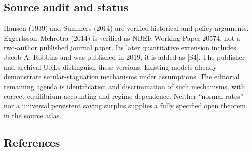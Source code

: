 \documentclass[11pt,a4paper]{article}
\begin{document}
\subsection*{Source audit and status}

Hansen (1939) and Summers (2014) are verified historical and policy arguments. Eggertsson--Mehrotra (2014) is verified as NBER Working Paper 20574, not a two-author published journal paper. Its later quantitative extension includes Jacob A. Robbins and was published in 2019; it is added as [S4]. The publisher and archival URLs distinguish these versions. Existing models already demonstrate secular-stagnation mechanisms under assumptions. The editorial remaining agenda is identification and discrimination of such mechanisms, with correct equilibrium accounting and regime dependence. Neither ``normal rates'' nor a universal persistent saving surplus supplies a fully specified open theorem in the source atlas.

\subsection*{References}
\end{document}
